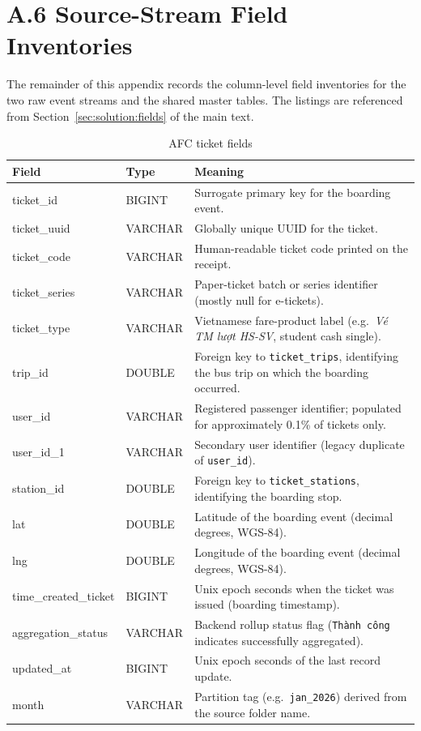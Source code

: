 \section*{A.6 Source-Stream Field Inventories}

The remainder of this appendix records the column-level field
inventories for the two raw event streams and the shared master tables.
The listings are referenced from Section~\ref{sec:solution:fields} of
the main text.

\begin{table}[!htbp]
\centering
\caption{AFC ticket fields}
\label{tab:fields:afc}
\footnotesize
\begin{tabularx}{\linewidth}{p{3.0cm} p{2.0cm} X}
\hline
\textbf{Field} & \textbf{Type} & \textbf{Meaning} \\
\hline
ticket\_id & BIGINT & Surrogate primary key for the boarding event. \\
ticket\_uuid & VARCHAR & Globally unique UUID for the ticket. \\
ticket\_code & VARCHAR & Human-readable ticket code printed on the receipt. \\
ticket\_series & VARCHAR & Paper-ticket batch or series identifier (mostly null for e-tickets). \\
ticket\_type & VARCHAR & Vietnamese fare-product label (e.g.\ \textit{Vé TM lượt HS-SV}, student cash single). \\
trip\_id & DOUBLE & Foreign key to \texttt{ticket\_trips}, identifying the bus trip on which the boarding occurred. \\
user\_id & VARCHAR & Registered passenger identifier; populated for approximately 0.1\% of tickets only. \\
user\_id\_1 & VARCHAR & Secondary user identifier (legacy duplicate of \texttt{user\_id}). \\
station\_id & DOUBLE & Foreign key to \texttt{ticket\_stations}, identifying the boarding stop. \\
lat & DOUBLE & Latitude of the boarding event (decimal degrees, WGS-84). \\
lng & DOUBLE & Longitude of the boarding event (decimal degrees, WGS-84). \\
time\_created\_ticket & BIGINT & Unix epoch seconds when the ticket was issued (boarding timestamp). \\
aggregation\_status & VARCHAR & Backend rollup status flag (\texttt{Th\`anh c\^ong} indicates successfully aggregated). \\
updated\_at & BIGINT & Unix epoch seconds of the last record update. \\
month & VARCHAR & Partition tag (e.g.\ \texttt{jan\_2026}) derived from the source folder name. \\
\hline
\end{tabularx}
\end{table}

